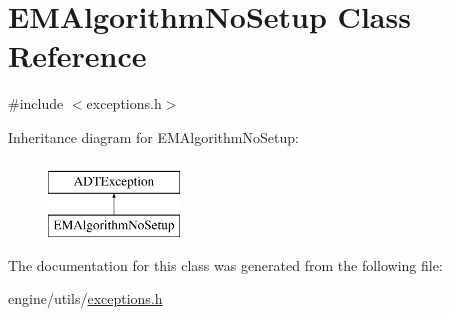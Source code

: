 \hypertarget{classEMAlgorithmNoSetup}{
\section{EMAlgorithmNoSetup Class Reference}
\label{classEMAlgorithmNoSetup}
}


{\ttfamily \#include $<$exceptions.h$>$}

Inheritance diagram for EMAlgorithmNoSetup:\begin{figure}[H]
\begin{center}
\leavevmode
\includegraphics[height=2cm]{classEMAlgorithmNoSetup}
\end{center}
\end{figure}


The documentation for this class was generated from the following file:\begin{DoxyCompactItemize}
\item 
engine/utils/\hyperlink{exceptions_8h}{exceptions.h}\end{DoxyCompactItemize}
